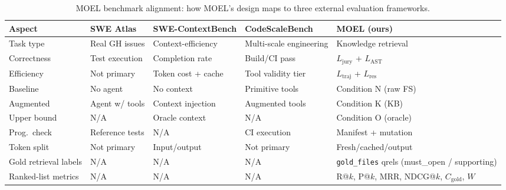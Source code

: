 \begin{table}[t]
\centering
\caption{MOEL benchmark alignment: how MOEL's design maps to three external evaluation frameworks.}
\label{tab:benchmark-alignment}
\small
\begin{tabular}{p{2.8cm}p{2.8cm}p{3.2cm}p{3.0cm}p{3.0cm}}
\toprule
\textbf{Aspect} & \textbf{SWE Atlas} & \textbf{SWE-ContextBench} & \textbf{CodeScaleBench} & \textbf{MOEL (ours)} \\
\midrule
Task type & Real GH issues & Context-efficiency & Multi-scale engineering & Knowledge retrieval \\
Correctness & Test execution & Completion rate & Build/CI pass & $L_\text{jury}$ + $L_\text{AST}$ \\
Efficiency & Not primary & Token cost + cache & Tool validity tier & $L_\text{traj}$ + $L_\text{res}$ \\
Baseline & No agent & No context & Primitive tools & Condition N (raw FS) \\
Augmented & Agent w/ tools & Context injection & Augmented tools & Condition K (KB) \\
Upper bound & N/A & Oracle context & N/A & Condition O (oracle) \\
Prog.\ check & Reference tests & N/A & CI execution & Manifest + mutation \\
Token split & Not primary & Input/output & Not primary & Fresh/cached/output \\
Gold retrieval labels & N/A & N/A & N/A & \texttt{gold\_files} qrels (must\_open / supporting) \\
Ranked-list metrics & N/A & N/A & N/A & R@$k$, P@$k$, MRR, NDCG@$k$, $C_{\text{gold}}$, $W$ \\
\bottomrule
\end{tabular}
\end{table}
